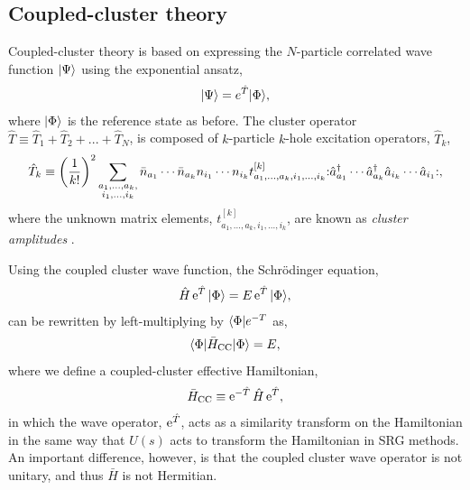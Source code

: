 \subsection{Coupled-cluster theory}
\label{subsec:cctheory}

Coupled-cluster theory is based on expressing the $N$-particle correlated wave function $| \Psi \rangle$ using the exponential ansatz,
\begin{align*}
  | \Psi \rangle = e^{\hat{T}}| \Phi \rangle,
\end{align*}
where $| \Phi \rangle$ is the reference state as before.  The cluster operator $\hat{T} \equiv \hat{T}_{1} + \hat{T}_{2} + ... + \hat{T}_{N}$, is composed of $k$-particle $k$-hole excitation operators, $\hat{T}_{k}$,
\begin{align} \label{eq:cc_amps}
  \hat{T}_{k} \equiv \left(\frac{1}{k!}\right)^{2}\sum\limits_{\substack{a_{1}, \dots, a_{k}, \\ i_{1}, \dots, i_{k}}} \bar{n}_{a_{1}} \cdots \bar{n}_{a_{k}} n_{i_{1}} \cdots n_{i_{k}} t^{[k]}_{a_{1}, \dots, a_{k}, i_{1}, \dots, i_{k}} \mathopen: \hat a_{a_{1}}^\dagger \cdots \hat a_{a_{k}}^\dagger \hat a_{i_{k}} \cdots \hat a_{i_{1}} \mathclose:,
\end{align}
where the unknown matrix elements, $t^{[k]}_{a_{1}, \dots, a_{k}, i_{1}, \dots, i_{k}}$, are known as \textit{cluster amplitudes} \cite{shavitt2009many}.

Using the coupled cluster wave function, the Schr\"odinger equation,
\begin{align} \label{eq:cc_schrodeq}
  \hat{H} \operatorname{e}^{\hat{T}} | \Phi \rangle = E \operatorname{e}^{\hat{T}}| \Phi \rangle,
\end{align}
can be rewritten by left-multiplying by $\langle \Phi |e^{-T}$ as,
\begin{align*}
  \langle \Phi | \bar{H}_{\mathrm{CC}} | \Phi \rangle = E,
\end{align*}
where we define a coupled-cluster effective Hamiltonian,
\begin{align} \label{eq:cc_heff0}
  \bar{H}_{\mathrm{CC}} \equiv \operatorname{e}^{-\hat{T}} \hat{H} \operatorname{e}^{\hat{T}},
\end{align}
in which the wave operator, $\operatorname{e}^{\hat{T}}$, acts as a similarity transform on the Hamiltonian in the same way that $\hat{U}(s)$ acts to transform the Hamiltonian in SRG methods.  An important difference, however, is that the coupled cluster wave operator is not unitary, and thus $\bar{H}$ is not Hermitian.

